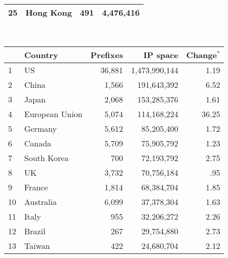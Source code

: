 \begin{table*}[p]
\begin{minipage}[t]{0.48\textwidth}
\begin{center}
\begin{tabular}{|l||l|r|r|}
25      &       Hong Kong       &       491     &       4,476,416       \tabularnewline
	\hline
	\end{tabular}
	\end{center}
	\ \newline\ \newline
\end{minipage}
%
\quad
%
\begin{minipage}[t]{0.48\textwidth}
	\begin{center}
	\caption{Top 25 countries with the most allocated IP space on \textbf{April 23, 2009}}
	\label{tab:top25 rir ip space 2009}
	\begin{tabular}{|l||l|r|r|r|}
		\hline
		&      \bf Country		& \bf Prefixes  &       \bf IP space 	& \bf Change$^{*}$ 	\tabularnewline \hline 
1       &       US      &       36,881  &       1,473,990,144   &         1.19  \tabularnewline
2       &       China   &       1,566   &       191,643,392     &         6.52  \tabularnewline
3       &       Japan   &       2,068   &       153,285,376     &         1.61  \tabularnewline
4       &       European Union  &       5,074   &       114,168,224     &        36.25  \tabularnewline
5       &       Germany &       5,612   &       85,205,400      &         1.72  \tabularnewline
6       &       Canada  &       5,709   &       75,905,792      &         1.23  \tabularnewline
7       &       South Korea     &       700     &       72,193,792      &         2.75  \tabularnewline
8       &       UK      &       3,732   &       70,756,184      &          .95  \tabularnewline
9       &       France  &       1,814   &       68,384,704      &         1.85  \tabularnewline
10      &       Australia       &       6,099   &       37,378,304      &         1.63  \tabularnewline
11      &       Italy   &       955     &       32,206,272      &         2.26  \tabularnewline
12      &       Brazil  &       267     &       29,754,880      &         2.73  \tabularnewline
13      &       Taiwan  &       422     &       24,680,704      &         2.12  \tabularnewline

\end{tabular}
\end{center}
\end{minipage}
\end{table*}
